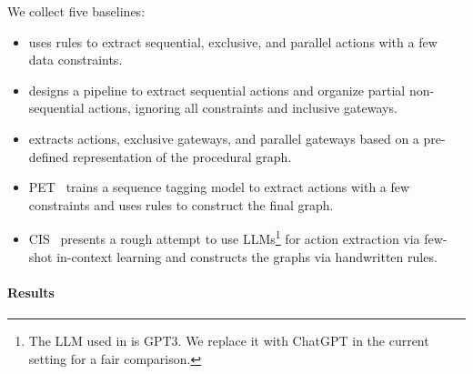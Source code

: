 We collect five baselines:
\begin{itemize}
    \item  \citet{sonbol2023machine} uses rules to extract sequential, exclusive, and parallel actions with a few data constraints.
    \item \citet{neuberger2023beyond} designs a pipeline to extract sequential actions and organize partial non-sequential actions, ignoring all constraints and inclusive gateways.
    \item \citet{sholiq2022generating} extracts actions, exclusive gateways, and parallel gateways based on a pre-defined representation of the procedural graph.
    \item  PET~\cite{bellan2023pet} trains a sequence tagging model to extract actions with a few constraints and uses rules to construct the final graph.
   \item  CIS~\cite{bellan2022leveraging} presents a rough attempt to use LLMs\footnote{The LLM used in \citet{bellan2022leveraging} is GPT3. We replace it with ChatGPT in the current setting for a fair comparison.} for action extraction via few-shot in-context learning and constructs the graphs via  handwritten rules.
\end{itemize}

\paragraph{Results}

